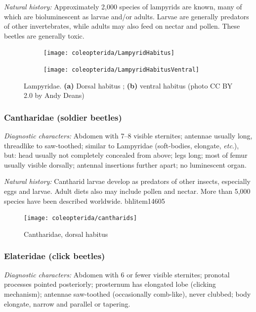 \noindent{}\textit{Natural history:} Approximately 2,000 species of lampyrids are known, many of which are bioluminescent as larvae and/or adults. Larvae are generally predators of other invertebrates, while adults may also feed on nectar and pollen. These beetles are generally toxic.

\begin{figure}[ht!]
  \centering
\begin{subfigure}[ht!]{0.42\textwidth}
    \texttt{[image: coleopterida/LampyridHabitus]}
  \caption{}
  \label{fig:lampyrid1}
\end{subfigure}
    \qquad
\begin{subfigure}[ht!]{0.3\textwidth}
    \texttt{[image: coleopterida/LampyridHabitusVentral]}
  \caption{}
  \label{fig:lampyrid2}\end{subfigure}
    \caption{Lampyridae. \textbf{(a)} Dorsal habitus \citep[modified from][Tab. 4, Fig. 22]{bhlitem14605}; \textbf{(b)} ventral habitus (photo CC BY 2.0 by Andy Deans)}\label{fig:lampyrids}
\end{figure}

\subsubsection{Cantharidae (soldier beetles)}
\noindent{}\textit{Diagnostic characters:} Abdomen with 7--8 visible sternites; antennae usually long, threadlike to saw-toothed; similar to Lampyridae (soft-bodies, elongate, \textit{etc}.), but: head usually not completely concealed from above; legs long; most of femur usually visible dorsally; antennal insertions further apart; no luminescent organ.\vspace{3mm}

\noindent{}\textit{Natural history:} Cantharid larvae develop as predators of other insects, especially eggs and larvae. Adult diets also may include pollen and nectar. More than 5,000 species have been described worldwide. bhlitem14605

\begin{figure}[ht!]
  \centering
    \texttt{[image: coleopterida/cantharids]}
  \caption{Cantharidae, dorsal habitus \cite[redrawn from][Plate 6, Fig. 14; plate 5, Fig. 11]{bhlitem14605}}
  \label{fig:cantharids}
\end{figure}

\subsubsection{Elateridae (click beetles)}
\noindent{}\textit{Diagnostic characters:} Abdomen with 6 or fewer visible sternites; pronotal processes pointed posteriorly; prosternum has elongated lobe (clicking mechanism); antennae saw-toothed (occasionally comb-like), never clubbed; body elongate, narrow and parallel or tapering.\vspace{3mm}

